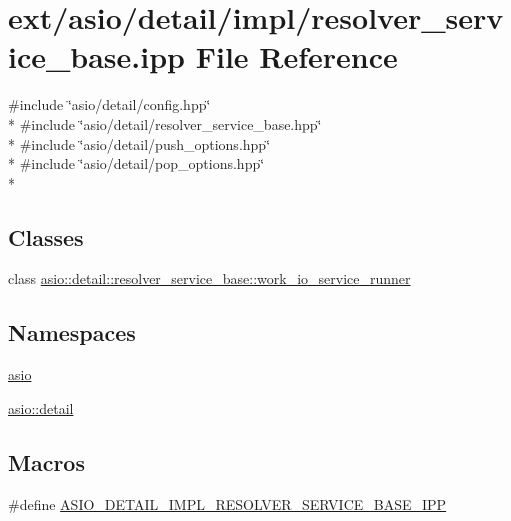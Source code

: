 \hypertarget{resolver__service__base_8ipp}{}\section{ext/asio/detail/impl/resolver\+\_\+service\+\_\+base.ipp File Reference}
\label{resolver__service__base_8ipp}
{\ttfamily \#include \char`\"{}asio/detail/config.\+hpp\char`\"{}}\\*
{\ttfamily \#include \char`\"{}asio/detail/resolver\+\_\+service\+\_\+base.\+hpp\char`\"{}}\\*
{\ttfamily \#include \char`\"{}asio/detail/push\+\_\+options.\+hpp\char`\"{}}\\*
{\ttfamily \#include \char`\"{}asio/detail/pop\+\_\+options.\+hpp\char`\"{}}\\*
\subsection*{Classes}
\begin{DoxyCompactItemize}
\item 
class \hyperlink{classasio_1_1detail_1_1resolver__service__base_1_1work__io__service__runner}{asio\+::detail\+::resolver\+\_\+service\+\_\+base\+::work\+\_\+io\+\_\+service\+\_\+runner}
\end{DoxyCompactItemize}
\subsection*{Namespaces}
\begin{DoxyCompactItemize}
\item 
 \hyperlink{namespaceasio}{asio}
\item 
 \hyperlink{namespaceasio_1_1detail}{asio\+::detail}
\end{DoxyCompactItemize}
\subsection*{Macros}
\begin{DoxyCompactItemize}
\item 
\#define \hyperlink{resolver__service__base_8ipp_ae7a08b1c58d6056db0beea68dba3ae0d}{A\+S\+I\+O\+\_\+\+D\+E\+T\+A\+I\+L\+\_\+\+I\+M\+P\+L\+\_\+\+R\+E\+S\+O\+L\+V\+E\+R\+\_\+\+S\+E\+R\+V\+I\+C\+E\+\_\+\+B\+A\+S\+E\+\_\+\+I\+P\+P}
\end{DoxyCompactItemize}


